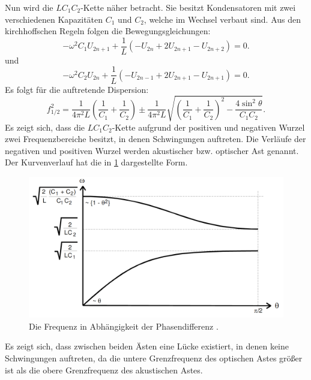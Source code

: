  Nun wird die $LC_1C_2$-Kette näher betracht. Sie besitzt Kondensatoren mit zwei
  verschiedenen Kapazitäten $C_1$ und $C_2$, welche im Wechsel verbaut sind.
 Aus den kirchhoffschen Regeln folgen die Bewegungsgleichungen:
 \begin{equation}
   -\omega^2 C_1 U_{2n+1} + \frac{1}{L} \left( -U_{2n} + 2U_{2n+1} - U_{2n+2} \right) = 0\text{.}
 \end{equation}
 und
 \begin{equation}
   -\omega^2 C_2 U_{2n} + \frac{1}{L} \left( -U_{2n-1} + 2U_{2n+1} - U_{2n+1} \right) = 0\text{.}
 \end{equation}
Es folgt für die auftretende Dispersion:
\begin{equation}
  f_{1/2}^2 = \frac{1}{4\pi^2L}\left(\frac{1}{C_1}+\frac{1}{C_2}\right) \pm \frac{1}{4\pi^2L}\sqrt{\left(\frac{1}{C_1}+\frac{1}{C_2} \right)^2 - \frac{4 \sin^2\theta}{C_1C_2}}\text{.}
\end{equation}
Es zeigt sich, dass die $LC_1C_2$-Kette aufgrund der positiven und negativen Wurzel
zwei Frequenzbereiche besitzt, in denen Schwingungen auftreten. Die Verläufe der
 negativen und positiven Wurzel werden akustischer bzw. optischer Ast genannt.
 Der Kurvenverlauf hat die in \ref{fig:thetaf} dargestellte Form.
 \begin{figure}[H]
   \centering
   \includegraphics[width=\linewidth-100pt,height=\textheight-100pt,keepaspectratio]{content/Grafiken/Dispersionskurven.png}
   \caption{Die Frequenz in Abhängigkeit der Phasendifferenz \cite{V356}.}
   \label{fig:thetaf}
 \end{figure}
 Es zeigt sich, dass zwischen beiden Ästen eine Lücke existiert,
  in denen keine Schwingungen auftreten, da die untere Grenzfrequenz des
   optischen Astes größer ist als die obere Grenzfrequenz des akustischen Astes.
